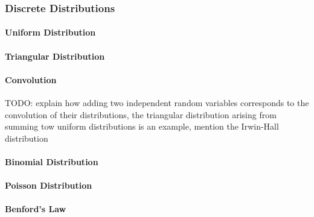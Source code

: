 \subsubsection{Discrete Distributions}

\paragraph{Uniform Distribution}

\paragraph{Triangular Distribution}

\paragraph{Convolution} TODO: explain how adding two independent random variables corresponds to the convolution of their distributions, the triangular distribution arising from summing tow uniform distributions is an example, mention the Irwin-Hall distribution



\paragraph{Binomial Distribution}


\paragraph{Poisson Distribution}


\paragraph{Benford's Law}



